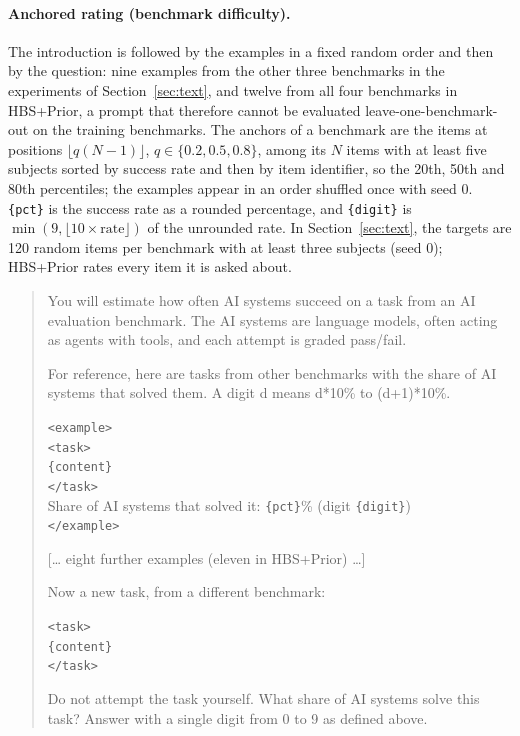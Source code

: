 \documentclass{article}
\newenvironment{promptbox}{\begin{quote}\small}{\end{quote}}
\begin{document}
\paragraph{Anchored rating (benchmark difficulty).} The introduction is followed by the examples in a fixed random order and then by the question: nine examples from the other three benchmarks in the experiments of Section~\ref{sec:text}, and twelve from all four benchmarks in HBS+Prior, a prompt that therefore cannot be evaluated leave-one-benchmark-out on the training benchmarks. The anchors of a benchmark are the items at positions $\lfloor q(N - 1) \rfloor$, $q \in \{0.2, 0.5, 0.8\}$, among its $N$ items with at least five subjects sorted by success rate and then by item identifier, so the 20th, 50th and 80th percentiles; the examples appear in an order shuffled once with seed 0. \texttt{\{pct\}} is the success rate as a rounded percentage, and \texttt{\{digit\}} is $\min(9, \lfloor 10 \times \text{rate} \rfloor)$ of the unrounded rate. In Section~\ref{sec:text}, the targets are 120 random items per benchmark with at least three subjects (seed 0); HBS+Prior rates every item it is asked about.
\begin{promptbox}
You will estimate how often AI systems succeed on a task from an AI evaluation benchmark. The AI systems are language models, often acting as agents with tools, and each attempt is graded pass/fail.

For reference, here are tasks from other benchmarks with the share of AI systems that solved them. A digit d means d*10\% to (d+1)*10\%.

\texttt{<example>}\\
\texttt{<task>}\\
\texttt{\{content\}}\\
\texttt{</task>}\\
Share of AI systems that solved it: \texttt{\{pct\}}\% (digit \texttt{\{digit\}})\\
\texttt{</example>}

[\ldots{} eight further examples (eleven in HBS+Prior) \ldots]

Now a new task, from a different benchmark:

\texttt{<task>}\\
\texttt{\{content\}}\\
\texttt{</task>}

Do not attempt the task yourself. What share of AI systems solve this task? Answer with a single digit from 0 to 9 as defined above.
\end{promptbox}
\end{document}

